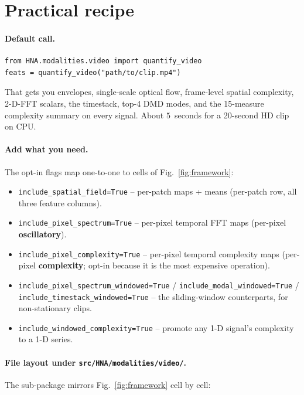 \documentclass[11pt,a4paper]{article}
\newcommand{\code}[1]{\texttt{\small #1}}
\newcommand{\famosc}[1]{\textcolor{famosc}{\textbf{#1}}}
\newcommand{\famcpl}[1]{\textcolor{famcpl}{\textbf{#1}}}
\begin{document}
\section{Practical recipe}\label{sec:recipe}

\paragraph{Default call.}
\begin{lstlisting}
from HNA.modalities.video import quantify_video
feats = quantify_video("path/to/clip.mp4")
\end{lstlisting}
That gets you envelopes, single-scale optical flow, frame-level
spatial complexity, 2-D-FFT scalars, the timestack, top-4 DMD modes,
and the 15-measure complexity summary on every signal. About
$5$~seconds for a 20-second HD clip on CPU.

\paragraph{Add what you need.} The opt-in flags map one-to-one to
cells of Fig.~\ref{fig:framework}:
\begin{itemize}[leftmargin=1.5em,itemsep=0.2em]
  \item \code{include\_spatial\_field=True} -- per-patch maps + means
        (per-patch row, all three feature columns).
  \item \code{include\_pixel\_spectrum=True} -- per-pixel temporal
        FFT maps (per-pixel \famosc{oscillatory}).
  \item \code{include\_pixel\_complexity=True} -- per-pixel temporal
        complexity maps (per-pixel \famcpl{complexity}; opt-in
        because it is the most expensive operation).
  \item \code{include\_pixel\_spectrum\_windowed=True} \quad /
        \quad \code{include\_modal\_windowed=True} \quad /
        \quad \code{include\_timestack\_windowed=True} -- the
        sliding-window counterparts, for non-stationary clips.
  \item \code{include\_windowed\_complexity=True} -- promote any 1-D
        signal's complexity to a 1-D series.
\end{itemize}

\paragraph{File layout under \code{src/HNA/modalities/video/}.} The
sub-package mirrors Fig.~\ref{fig:framework} cell by cell:
\end{document}
